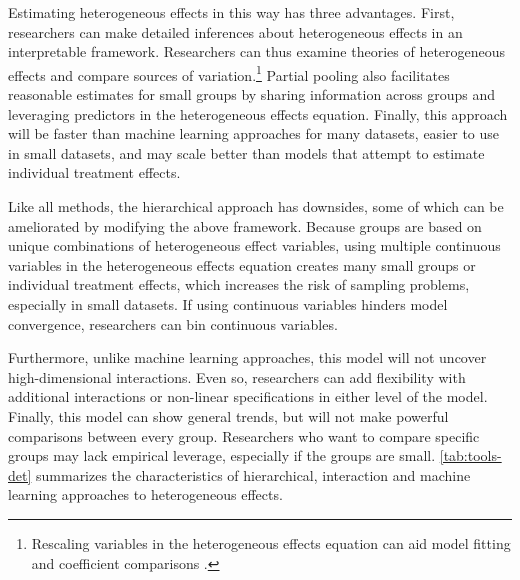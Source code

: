 \documentclass[12pt]{article}
\begin{document}
Estimating heterogeneous effects in this way has three advantages.
First, researchers can make detailed inferences about heterogeneous effects in an interpretable framework. 
Researchers can thus examine theories of heterogeneous effects and compare sources of variation.\footnote{Rescaling variables in the heterogeneous effects equation can aid model fitting and coefficient comparisons \citep{Gelman2008}.} 
Partial pooling also facilitates reasonable estimates for small groups by sharing information across groups and leveraging predictors in the heterogeneous effects equation. 
Finally, this approach will be faster than machine learning approaches for many datasets, easier to use in small datasets, and may scale better than models that attempt to estimate individual treatment effects.


Like all methods, the hierarchical approach has downsides, some of which can be ameliorated by modifying the above framework. 
Because groups are based on unique combinations of heterogeneous effect variables, using multiple continuous variables in the heterogeneous effects equation creates many small groups or individual treatment effects, which increases the risk of sampling problems, especially in small datasets. 
If using continuous variables hinders model convergence, researchers can bin continuous variables.


Furthermore, unlike machine learning approaches, this model will not uncover high-dimensional interactions. 
Even so, researchers can add flexibility with additional interactions or non-linear specifications in either level of the model. 
Finally, this model can show general trends, but will not make powerful comparisons between every group. 
Researchers who want to compare specific groups may lack empirical leverage, especially if the groups are small.
\autoref{tab:tools-det} summarizes the characteristics of hierarchical, interaction and machine learning approaches to heterogeneous effects. 
\end{document}
